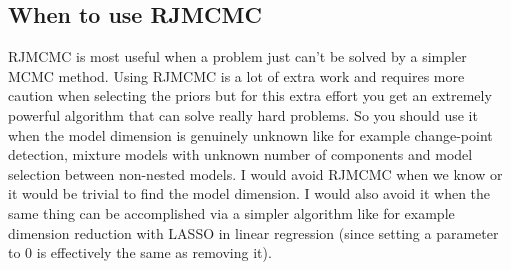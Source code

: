 \documentclass[10pt]{article}
\begin{document}
\subsection{When to use RJMCMC}
RJMCMC is most useful when a problem just can't be solved by a simpler MCMC method. Using RJMCMC is a lot of extra work and requires more caution when selecting the priors but for this extra effort you get an extremely powerful algorithm that can solve really hard problems. So you should use it when the model dimension is genuinely unknown like for example change-point detection, mixture models with unknown number of components and model selection between non-nested models. I would avoid RJMCMC when we know or it would be trivial to find the model dimension. I would also avoid it when the same thing can be accomplished via a simpler algorithm like for example dimension reduction with LASSO in linear regression (since setting a parameter to 0 is effectively the same as removing it).

\printbibliography
\end{document}
